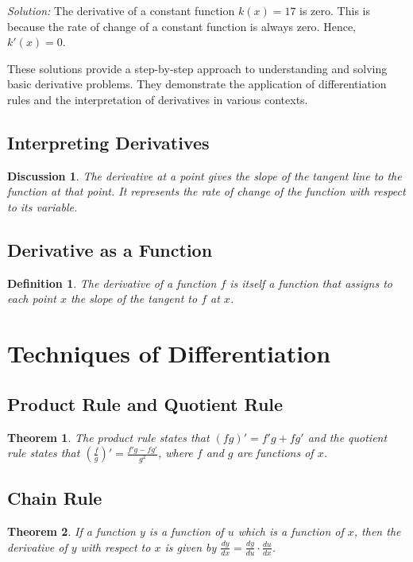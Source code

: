\documentclass[a4paper,12pt]{book}
\newcounter{problem}
\newenvironment{solution}[1][]
{\par\noindent\textit{Solution:} \rmfamily}{\medskip}
\newtheorem{theorem}{Theorem}
\newtheorem{definition}{Definition}
\newtheorem{discussion}{Discussion}
\begin{document}
\begin{solution}[to Exercise 4]
The derivative of a constant function \( k(x) = 17 \) is zero. This is because the rate of change of a constant function is always zero. Hence, \( k'(x) = 0 \).
\end{solution}

These solutions provide a step-by-step approach to understanding and solving basic derivative problems. They demonstrate the application of differentiation rules and the interpretation of derivatives in various contexts.


\subsection{Interpreting Derivatives}
\begin{discussion}
The derivative at a point gives the slope of the tangent line to the function at that point. It represents the rate of change of the function with respect to its variable.
\end{discussion}

\subsection{Derivative as a Function}
\begin{definition}
The derivative of a function \( f \) is itself a function that assigns to each point \( x \) the slope of the tangent to \( f \) at \( x \).
\end{definition}

\section{Techniques of Differentiation}
\subsection{Product Rule and Quotient Rule}
\begin{theorem}
The product rule states that \( (fg)' = f'g + fg' \) and the quotient rule states that \( \left(\frac{f}{g}\right)' = \frac{f'g - fg'}{g^2} \), where \( f \) and \( g \) are functions of \( x \).
\end{theorem}

\subsection{Chain Rule}
\begin{theorem}
If a function \( y \) is a function of \( u \) which is a function of \( x \), then the derivative of \( y \) with respect to \( x \) is given by \( \frac{dy}{dx} = \frac{dy}{du} \cdot \frac{du}{dx} \).
\end{theorem}
\end{document}
